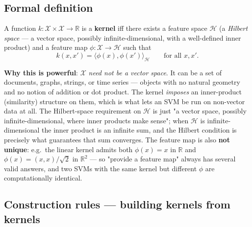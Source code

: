 \documentclass[11pt, a4paper]{article}
\newcommand{\kw}[1]{\textbf{#1}}
\begin{document}
\subsection{Formal definition}

\begin{defbox}[kernel]
A function $k:\mathcal X\times\mathcal X\to\mathbb R$ is a \kw{kernel} iff there exists a feature
space $\mathcal H$ (a \emph{Hilbert space} — a vector space, possibly infinite-dimensional, with a
well-defined inner product) and a feature map $\phi:\mathcal X\to\mathcal H$ such that
\[
k(x,x')=\langle\phi(x),\phi(x')\rangle_{\mathcal H}\qquad\text{for all }x,x'.
\]
\end{defbox}

\kw{Why this is powerful}: $\mathcal X$ \emph{need not be a vector space}. It can be a set of
documents, graphs, strings, or time series — objects with no natural geometry and no notion of
addition or dot product. The kernel \emph{imposes} an inner-product (similarity) structure on them,
which is what lets an SVM be run on non-vector data at all. The Hilbert-space requirement on
$\mathcal H$ is just "a vector space, possibly infinite-dimensional, where inner products make
sense"; when $\mathcal H$ is infinite-dimensional the inner product is an infinite sum, and the
Hilbert condition is precisely what guarantees that sum converges. The feature map is also \kw{not
unique}: e.g.\ the linear kernel admits both $\phi(x)=x$ in $\mathbb R$ and
$\phi(x)=(x,x)/\sqrt2$ in $\mathbb R^2$ — so "provide a feature map" always has several valid
answers, and two SVMs with the same kernel but different $\phi$ are computationally identical.

\subsection{Construction rules — building kernels from kernels}
\end{document}
